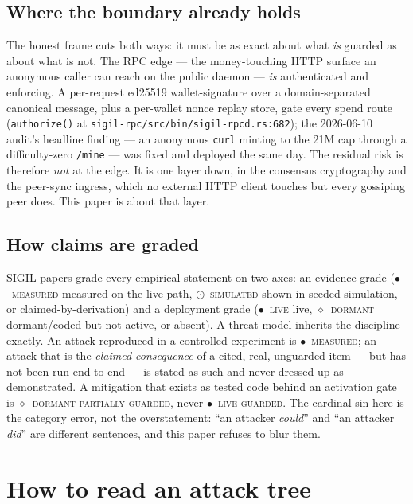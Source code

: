 \documentclass[10pt,a4paper]{article}
\newcommand{\stM}{\textcolor{sigilcyan}{$\bullet$}~{\scriptsize\textcolor{sigilcyan}{\textsc{measured}}}}
\newcommand{\stL}{\textcolor{sigilcyan}{$\bullet$}~{\scriptsize\textcolor{sigilcyan}{\textsc{live}}}}
\newcommand{\stS}{\textcolor{sigilblue}{$\odot$}~{\scriptsize\textcolor{sigilblue}{\textsc{simulated}}}}
\newcommand{\stD}{\textcolor{sigilviolet}{$\diamond$}~{\scriptsize\textcolor{sigilviolet}{\textsc{dormant}}}}
\newcommand{\mgGuard}{{\scriptsize\textcolor{sigilcyan}{\textsc{guarded}}}}
\newcommand{\mgPartial}{{\scriptsize\textcolor{sigilviolet}{\textsc{partially guarded}}}}
\begin{document}
\subsection*{Where the boundary already holds}

The honest frame cuts both ways: it must be as exact about what \emph{is} guarded as about
what is not. The RPC edge — the money-touching HTTP surface an anonymous caller can reach
on the public daemon — \emph{is} authenticated and enforcing. A per-request ed25519
wallet-signature over a domain-separated canonical message, plus a per-wallet nonce replay
store, gate every spend route (\texttt{authorize()} at
\texttt{sigil-rpc/src/bin/sigil-rpcd.rs:682}); the 2026-06-10 audit's headline finding — an
anonymous \texttt{curl} minting to the 21M cap through a difficulty-zero \texttt{/mine} —
was fixed and deployed the same day. The residual risk is therefore \emph{not} at the
edge. It is one layer down, in the consensus cryptography and the peer-sync ingress, which
no external HTTP client touches but every gossiping peer does. This paper is about that
layer.

\subsection*{How claims are graded}

SIGIL papers grade every empirical statement on two axes: an evidence grade (\stM{}
measured on the live path, \stS{} shown in seeded simulation, or claimed-by-derivation)
and a deployment grade (\stL{} live, \stD{} dormant/coded-but-not-active, or absent). A
threat model inherits the discipline exactly. An attack reproduced in a controlled
experiment is \stM{}; an attack that is the \emph{claimed consequence} of a cited, real,
unguarded item — but has not been run end-to-end — is stated as such and never dressed up
as demonstrated. A mitigation that exists as tested code behind an activation gate is
\stD{} \mgPartial{}, never \stL{} \mgGuard{}. The cardinal sin here is the category error,
not the overstatement: ``an attacker \emph{could}'' and ``an attacker \emph{did}'' are
different sentences, and this paper refuses to blur them.

\section{How to read an attack tree}
\label{sec:legend}
\end{document}
